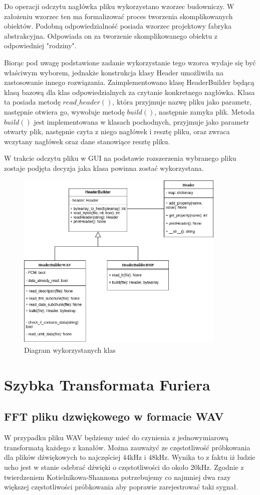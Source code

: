 \documentclass{article}
\begin{document}
Do operacji odczytu nagłówka pliku wykorzystano wzorzec budowniczy. W założeniu wzorzec ten ma formalizować proces tworzenia skomplikowanych obiektów. Podobną odpowiedzialność posiada wzorzec projektowy fabryka abstrakcyjna. Odpowiada on za tworzenie skomplikowanego obiektu z odpowiedniej "rodziny". 

Biorąc pod uwagę podstawione zadanie wykorzystanie tego wzorca wydaje się być właściwym wyborem, jednakże konstrukcja klasy Header umożliwiła na zastosowanie innego rozwiązania. Zaimplementowano klasę HeaderBuilder będącą klasą bazową dla klas odpowiedzialnych za czytanie konkretnego  nagłówka. Klasa ta posiada metodę $read\_header()$, która przyjmuje nazwę pliku jako parametr, następnie otwiera go, wywołuje metodę $build()$, następnie zamyka plik. Metoda $build()$ jest implementowana w klasach pochodnych, przyjmuje jako parametr otwarty plik, następnie czyta z niego nagłówek i resztę pliku, oraz zwraca wczytany nagłówek oraz dane stanowiące resztę pliku.

W trakcie odczytu pliku w GUI na podstawie rozszerzenia wybranego pliku zostaje podjęta decyzja jaka klasa powinna zostać wykorzystana.

\begin{figure} 
\centering
\includegraphics[width=10cm]{Untitled_Diagram.jpg}
\caption{Diagram wykorzystanych klas}
\end{figure}

\section{Szybka Transformata Furiera}
\subsection{FFT pliku dzwiękowego w formacie WAV}
W przypadku pliku WAV będziemy mieć do czynienia z jednowymiarową transformatą każdego z kanałów. Można zauważyć ze częstotliwość próbkowania dla plików dźwiękowych to najczęściej 44kHz i 48kHz. Wynika to z faktu iż ludzie ucho jest w stanie odebrać dźwięki o częstotliwości do około 20kHz. Zgodnie z twierdzeniem Kotielnikowa-Shannona potrzebujemy co najmniej dwa razy większej częstotliwości próbkowania aby poprawie zarejestrować taki sygnał.
\end{document}
